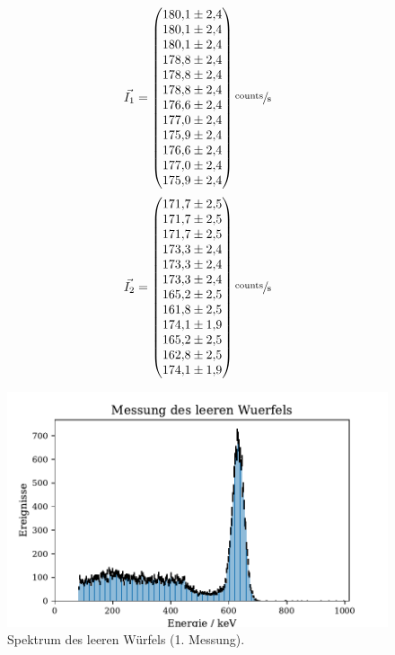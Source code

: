 \begin{equation}
	\vec{I_1}=
	\begin{pmatrix}
		\num{180.1 \pm 2.4} \\
		\num{180.1 \pm 2.4} \\
		\num{180.1\pm 2.4} \\
		\num{178.8\pm 2.4} \\
		\num{178.8\pm 2.4} \\
		\num{178.8\pm 2.4} \\
		\num{176.6\pm 2.4} \\
		\num{177.0\pm 2.4} \\
		\num{175.9\pm 2.4} \\
    \num{176.6\pm 2.4} \\
    \num{177.0\pm 2.4} \\
    \num{175.9\pm 2.4} \\
	\end{pmatrix}
    \sfrac{\text{counts}}{\text{s}}
	\label{eq:vecleer1}
\end{equation}
\begin{equation}
	\vec{I_2}=
	\begin{pmatrix}
		\num{171.7 \pm 2.5} \\
		\num{171.7 \pm 2.5} \\
		\num{171.7\pm 2.5} \\
		\num{173.3\pm 2.4} \\
		\num{173.3\pm 2.4} \\
		\num{173.3\pm 2.4} \\
		\num{165.2\pm 2.5} \\
		\num{161.8\pm 2.5} \\
		\num{174.1\pm 1.9} \\
    \num{165.2\pm 2.5} \\
    \num{162.8\pm 2.5} \\
    \num{174.1\pm 1.9} \\
	\end{pmatrix}
    \sfrac{\text{counts}}{\text{s}}
	\label{eq:vecleer2}
\end{equation}
\begin{figure}[H]
  \centering
  \includegraphics{plots/Alu_leer.pdf}
  \caption{Spektrum des leeren Würfels (1. Messung).\cite{anleitung}}
  \label{Leermessung}
\end{figure}
